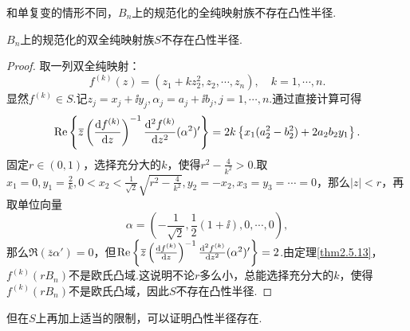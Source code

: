 和单复变的情形不同，$B_n$上的规范化的全纯映射族不存在凸性半径.
\begin{theorem}\label{thm2.8.3}
	$B_n$上的规范化的双全纯映射族$S$不存在凸性半径.
\end{theorem}
\begin{proof}
	取一列双全纯映射：
	\[f^{(k)}(z)=(z_1+kz_2^2,z_2,\cdots,z_n),\quad k=1,\cdots,n.\]
	显然$f^{(k)}\in S$.记$z_j=x_j+\ii y_j,\alpha_j=a_j+\ii b_j,j=1,\cdots,n$.通过直接计算可得
	\[\operatorname{Re}\left\{{}\mkern1mu\overline{\mkern-1muz}\left(\frac{\mathop{}\!\mathrm df^{(k)}}{\mathop{}\!\mathrm dz}\right)^{-1}\frac{\mathop{}\!\mathrm d^2f^{(k)}}{\mathop{}\!\mathrm dz^2}(\alpha^2)'\right\}=2k\left\{x_1(a_2^2-b_2^2)+2a_2b_2y_1\right\}.\]
	固定$r\in(0,1)$，选择充分大的$k$，使得$r^2-\frac{4}{k^2}>0$.取$x_1=0,y_1=\frac{2}{k},0<x_2<\frac1{\sqrt{2}}\sqrt{r^2-\frac{4}{k^2}},y_2=-x_2,x_3=y_3=\cdots=0$，那么$|z|<r$，再取单位向量
	\[\alpha=\left(-\frac1{\sqrt{2}},\frac12(1+\ii),0,\cdots,0\right),\]
	那么$\Re(\bar{z}\alpha')=0$，但$\operatorname{Re}\left\{{}\mkern1mu\overline{\mkern-1muz}\left(\frac{\mathop{}\!\mathrm df^{(k)}}{\mathop{}\!\mathrm dz}\right)^{-1}\frac{\mathop{}\!\mathrm d^2f^{(k)}}{\mathop{}\!\mathrm dz^2}(\alpha^2)'\right\}=2$.由定理\ref{thm2.5.13}，$f^{(k)}(rB_n)$不是欧氏凸域.这说明不论$r$多么小，总能选择充分大的$k$，使得$f^{(k)}(rB_n)$不是欧氏凸域，因此$S$不存在凸性半径.
\end{proof}
但在$S$上再加上适当的限制，可以证明凸性半径存在.
